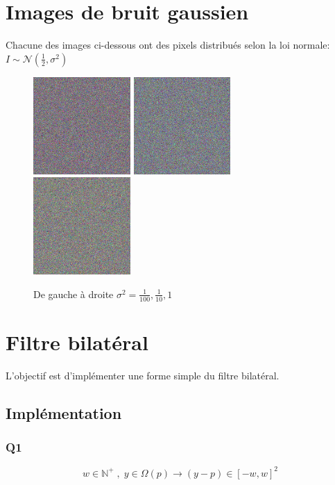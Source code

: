 \documentclass{article}
\begin{document}
\section{Images de bruit gaussien}
Chacune des images ci-dessous ont des pixels distribués selon la loi normale: $I \sim \mathcal{N}(\frac{1}{2}, \sigma^2)$

\begin{figure}[h]
	\includegraphics[width=0.33\textwidth]{noise001.png}
	\includegraphics[width=0.33\textwidth]{noise01.png}
	\includegraphics[width=0.33\textwidth]{noise10.png}
  \caption{De gauche à droite $\sigma^2 = \frac{1}{100}, \frac{1}{10}, 1$}
\end{figure}
\newpage
\section{Filtre bilatéral}
L'objectif est d'implémenter une forme simple du filtre bilatéral.
\subsection{Implémentation}
\subsubsection*{Q1}
$$w \in \mathbb{N}^+ \;, \; y \in \Omega(p) \rightarrow (y-p) \in {[{-w}, w]}^2$$
\end{document}
